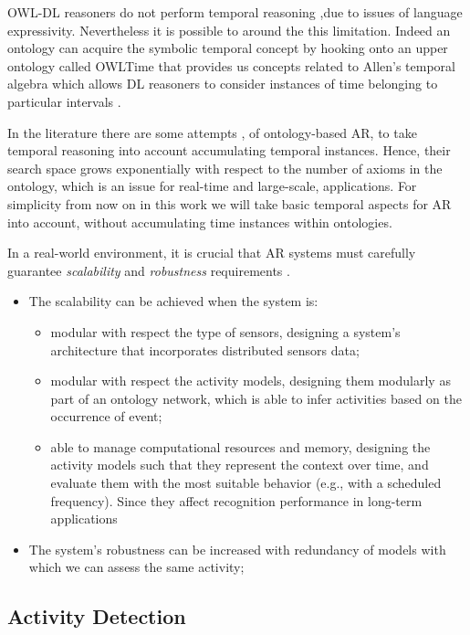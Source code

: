 \documentclass{thesisreport}
\begin{document}
  OWL-DL reasoners do not perform temporal reasoning ,due to issues of language expressivity. Nevertheless it is possible to around the this limitation. Indeed an ontology can acquire the symbolic temporal concept by hooking onto an upper ontology called OWLTime that provides us concepts related to Allen’s temporal algebra which allows DL reasoners to consider instances of time belonging to particular intervals \cite{kareem2018arianna}.
  
  In the literature there are some attempts \cite{scalmato2013describing,buoncompagni2017towards}, of ontology-based AR, to take temporal reasoning into account accumulating temporal instances. Hence, their search space grows exponentially \cite{salguero2018using} with respect to the number of axioms in the ontology, which is an issue for real-time and large-scale,  applications. 
  For simplicity from now on in this work we will take basic temporal aspects for AR into account, without accumulating time instances within ontologies.

 
 In a real-world environment, it is crucial that AR systems must carefully guarantee \textit{scalability} and \textit{robustness} requirements \cite{kareem2018arianna}.
 \begin{itemize}
     \item The scalability can be achieved when the system is:
     \begin{itemize}
         \item modular with respect the type of sensors, designing a system’s architecture that incorporates distributed sensors data;
         \item modular with respect the activity models, designing them modularly as part of an ontology network, which is able to infer activities based on the occurrence of event;
         \item able to manage computational resources and memory, designing the activity models such that they represent the context over time, and evaluate them with the most suitable behavior (e.g., with a scheduled frequency). Since they affect recognition performance in long-term applications 
     \end{itemize}
     \item The system’s robustness can be increased with redundancy of models with which we can assess the same activity;
 \end{itemize}
 
 
 \subsection{Activity Detection}
\end{document}

